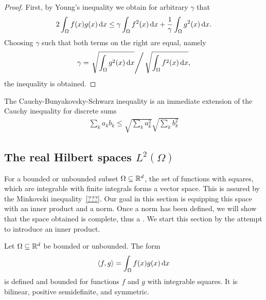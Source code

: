 \begin{proof}
  First, by Young's inequality we obtain for arbitrary
  $\gamma$ that
  \begin{gather*}
    2 \int_\Omega f(x)g(x)\,\mathrm{d} x
    \le \gamma \int_\Omega f^2(x)\,\mathrm{d} x
    + \frac1\gamma \int_\Omega g^2(x)\,\mathrm{d} x.
  \end{gather*}
  Choosing $\gamma$ such that both terms on the right are equal,
  namely
  \begin{gather*}
    \gamma = \left. \sqrt{\int_\Omega g^2(x)\,\mathrm{d} x} \right/ \sqrt{\int_\Omega f^2(x)\,\mathrm{d} x},
  \end{gather*}
  the inequality is obtained.
\end{proof}

\begin{note}
  The Cauchy-Bunyakovsky-Schwarz inequality is an immediate extension
  of the Cauchy inequality for discrete sums
  \begin{gather}
    \sum_k a_k b_k \le \sqrt{\sum_ka_k^2} \sqrt{\sum_kb_k^2}
  \end{gather}
\end{note}

\subsection{The real Hilbert spaces $L^2(\Omega)$}

\begin{intro}
  For a bounded or unbounded subset $\Omega\subseteq \mathbb R^d$, the set of
  functions with squares, which are integrable with finite integrals
  forms a vector space. This is assured by the Minkovski
  inequality~\eqref{???}. Our goal in this section is equipping this
  space with an inner product and a norm. Once a norm has been
  defined, we will show that the space obtained is complete, thus a
  .
  We start this section by the attempt to introduce an inner
  product.
\end{intro}

\begin{lemma}
\label{lemma:lp:bilinear}
  Let $\Omega \subseteq \mathbb R^d$ be bounded or unbounded.
  The form
  \begin{gather}
    \label{eq:lp:4}
    \scal(f,g) = \int_\Omega f(x)g(x)\dx
  \end{gather}
  is defined and bounded for functions $f$ and $g$ with integrable
  squares. It is bilinear, positive semidefinite, and symmetric.
\end{lemma}

